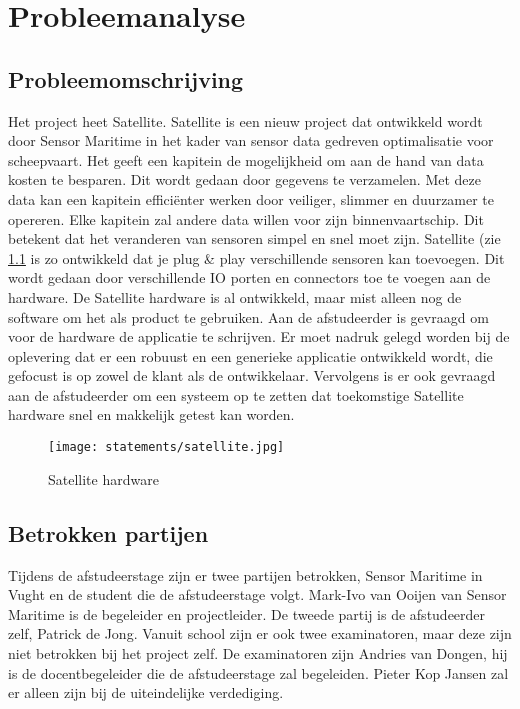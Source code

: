 \chapter{Probleemanalyse}

\section{Probleemomschrijving}
Het project heet Satellite. Satellite is een nieuw project dat ontwikkeld wordt door Sensor Maritime in het kader van sensor data gedreven optimalisatie voor scheepvaart. Het geeft een kapitein de mogelijkheid om aan de hand van data kosten te besparen. Dit wordt gedaan door gegevens te verzamelen. Met deze data kan een kapitein efficiënter werken door veiliger, slimmer en duurzamer te opereren. Elke kapitein zal andere data willen voor zijn binnenvaartschip. Dit betekent dat het veranderen van sensoren simpel en snel moet zijn. Satellite (zie \ref{fig:shw} is zo ontwikkeld dat je plug \& play verschillende sensoren kan toevoegen. Dit wordt gedaan door verschillende IO porten en connectors toe te voegen aan de hardware. De Satellite hardware is al ontwikkeld, maar mist alleen nog de software om het als product te gebruiken. Aan de afstudeerder is  gevraagd om voor de hardware de applicatie te schrijven. Er moet nadruk gelegd worden bij de oplevering dat er een robuust en een generieke applicatie ontwikkeld wordt, die gefocust is op zowel de klant als de ontwikkelaar. Vervolgens is er ook gevraagd aan de afstudeerder om een systeem op te zetten dat toekomstige Satellite hardware snel en makkelijk getest kan worden.
\begin{figure}[h!]
	\begin{centering}

	\texttt{[image: statements/satellite.jpg]}
	\caption{Satellite hardware}
	\label{fig:shw}
	\end{centering}
\end{figure}

\section{Betrokken partijen}
Tijdens de afstudeerstage zijn er twee partijen betrokken, Sensor Maritime in Vught en de student die de afstudeerstage volgt. Mark-Ivo van Ooijen van Sensor Maritime is de begeleider en projectleider. De tweede partij is de afstudeerder zelf, Patrick de Jong. Vanuit school zijn er ook twee examinatoren, maar deze zijn niet betrokken bij het project zelf. De examinatoren zijn Andries van Dongen, hij is de docentbegeleider die de afstudeerstage zal begeleiden. Pieter Kop Jansen zal er alleen zijn bij de uiteindelijke verdediging.

